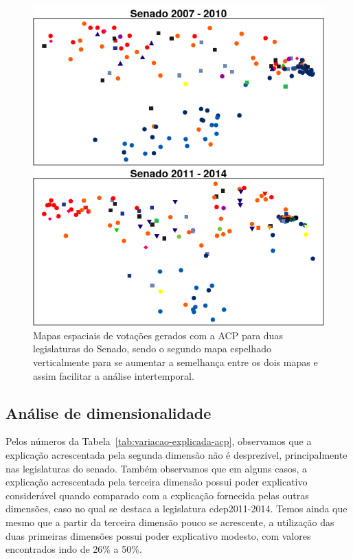\documentclass[a4paper, 12pt]{article}
\begin{document}
\begin{figure}[h!]
  \centering
  \includegraphics[scale=0.7]{figs/sen-rotacao.png}
  \caption{Mapas espaciais de votações gerados com a ACP para duas legislaturas do Senado, sendo o segundo mapa espelhado verticalmente para se aumentar a semelhança entre os dois mapas e assim facilitar a análise intertemporal.}
  \label{fig:sen-rotacao}
\end{figure}

\subsection{Análise de dimensionalidade}

Pelos números da Tabela~\ref{tab:variacao-explicada-acp}, observamos que a explicação acrescentada pela segunda dimensão não é desprezível, principalmente nas legislaturas do senado. Também observamos que em alguns casos, a explicação acrescentada pela terceira dimensão possui poder explicativo considerável quando comparado com a explicação fornecida pelas outras dimensões, caso no qual se destaca a legislatura cdep2011-2014. Temos ainda que mesmo que a partir da terceira dimensão pouco se acrescente, a utilização das duas primeiras dimensões possui poder explicativo modesto, com valores encontrados indo de 26\% a 50\%. 
\end{document}
